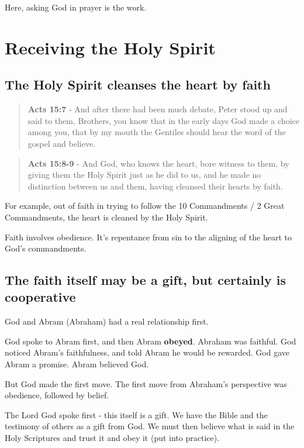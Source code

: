 \documentclass[11pt]{article}
\begin{document}
Here, asking God in prayer is the work.

\section{Receiving the Holy Spirit}
\label{sec:org27aa2b6}
\subsection{The Holy Spirit cleanses the heart by faith}
\label{sec:org8ab8efc}
\begin{quote}
\textbf{Acts 15:7} - And after there had been much debate, Peter stood up and said to them, Brothers, you know that in the early days God made a choice among you, that by my mouth the Gentiles should hear the word of the gospel and believe.
\end{quote}

\begin{quote}
\textbf{Acts 15:8-9} - And God, who knows the heart, bore witness to them, by giving them the Holy Spirit just as he did to us, and he made no distinction between us and them, having cleansed their hearts by faith.
\end{quote}

For example, out of faith in trying to follow the 10 Commandments / 2 Great Commandments, the heart is cleaned by the Holy Spirit.

Faith involves obedience. It's repentance from sin to the aligning of the heart to God's commandments.

\subsection{The faith itself may be a gift, but certainly is cooperative}
\label{sec:org85b908c}
God and Abram (Abraham) had a real relationship first.

God spoke to Abram first, and then Abram \textbf{obeyed}.
Abraham was faithful.
God noticed Abram's faithfulness, and told Abram he would be rewarded.
God gave Abram a promise.
Abram believed God.

But God made the first move.
The first move from Abraham's perspective was obedience, followed by belief.

The Lord God spoke first - this itself is a gift. We have the Bible and the testimony of others as a gift from God.
We must then believe what is said in the Holy Scriptures and trust it and obey it (put into practice).
\end{document}
